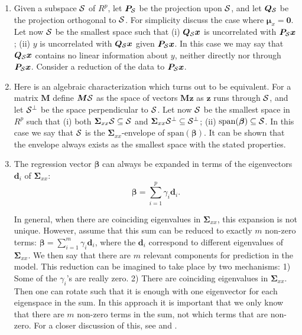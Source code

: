 \documentclass[num-refs]{wiley-article}
\begin{document}
\begin{enumerate}[label=\Alph*.]

\item Given a subspace $\cal{S}$ of $R^p$, let $\bm{P}_{\cal{S}}$ be the projection upon $\cal{S}$, and let $\bm{Q}_{\cal{S}}$ be the projection orthogonal to $\cal{S}$. For simplicity discuss the case where $\bm{\mu}_x =\bm{0}$. Let now $\cal{S}$ be the smallest space such that (i) $\bm{Q}_{\cal{S}}\bm{x}$ is uncorrelated with $\bm{P}_{\cal{S}}\bm{x}$; (ii) $y$ is uncorrelated with $\bm{Q}_{\cal{S}}\bm{x}$ given $\bm{P}_{\cal{S}}\bm{x}$. In this case we may say that $\bm{Q}_{\cal{S}}\bm{x}$ contains no linear information about $y$, neither directly nor through $\bm{P}_{\cal{S}}\bm{x}$. Consider a reduction of the data to $\bm{P}_{\cal{S}}\bm{x}$.
  \smallskip

\item  Here is an algebraic characterization which turns out to be equivalent. For a matrix $\bm{M}$ define $\bm{M}\cal{S}$ as the space of vectors $\bm{Mz}$ as $\bm{z}$ runs through $\cal{S}$, and let $\cal{S}^\perp$ be
  the space perpendicular to $\cal{S}$. Let now $\cal{S}$ be the smallest space in $R^p$ such that (i) both $\bm{\Sigma}_{xx}\cal{S}\subseteq\cal{S}$ and
  $\bm{\Sigma}_{xx}\cal{S}^\perp\subseteq\cal{S}^\perp$; (ii) $\mathrm{span}(\bm{\beta})\subseteq\cal{S}$. In this case we say that $\cal{S}$
  is the $\bm{\Sigma}_{xx}$-envelope of $\mathrm{span}(\bm{\beta})$. It can be shown \citep{cook2010envelope} that the envelope always exists as the smallest space with the stated properties.
  \smallskip

\item The regression vector $\bm{\beta}$ can always be expanded in terms of the eigenvectors $\bm{d}_{i}$ of $\bm{\Sigma}_{xx}$:
  \begin{equation}
    \bm{\beta}=\sum_{i=1}^p \gamma_{i}\bm{d}_{i}.
    \label{beta}
  \end{equation}

  In general, when there are coinciding eigenvalues in $\bm{\Sigma}_{xx}$, this expansion is not unique. However, assume that this sum can be reduced to exactly $m$ non-zero terms:
  $\bm{\beta}=\sum_{i=1}^m \gamma_{i}\bm{d}_{i}$, where the $\bm{d}_i$ correspond to different eigenvalues of $\bm{\Sigma}_{xx}$. We then say that there are $m$ relevant components for prediction in the model. This reduction can be imagined to take place by two mechanisms: 1) Some of the $\gamma_i$'s are really zero. 2) There are coinciding eigenvalues in $\bm{\Sigma}_{xx}$. Then one can rotate such that it is enough with one eigenvector for each eigenspace in the sum. In this approach it is important that we only know that there are $m$ non-zero terms in the sum, not which  terms that are non-zero. For a closer discussion of this, see \citet{naes1993relevant} and \citet{helland1994comparison}.
  \smallskip


\end{enumerate}
\end{document}
